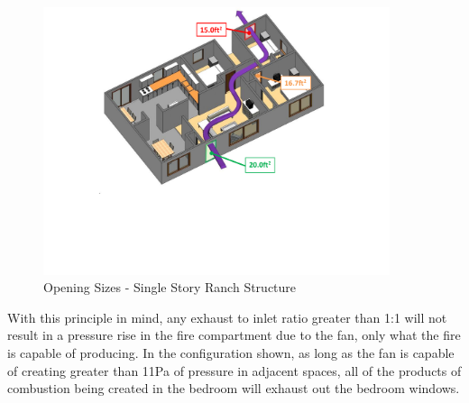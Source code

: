 \documentclass{article}
\begin{document}
\begin{figure}[H]
	\centering
	\includegraphics[width = 4in]{0_Images/Tactical_Considerations/PPA_Exhaust_Dependant/Opening_Sizes.pdf}
	\caption{Opening Sizes - Single Story Ranch Structure}
	\label{fig:RanchStructureOpenings}
\end{figure}

With this principle in mind, any exhaust to inlet ratio greater than 1:1 will not result in a pressure rise in the fire compartment due to the fan, only what the fire is capable of producing. In the configuration shown, as long as the fan is capable of creating greater than 11Pa of pressure in adjacent spaces, all of the products of combustion being created in the bedroom will exhaust out the bedroom windows. 
\end{document}
